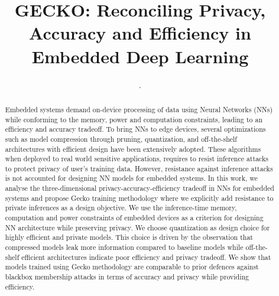 \documentclass[sigconf]{acmart}
\begin{document}
\title{GECKO: Reconciling Privacy, Accuracy and Efficiency in Embedded Deep Learning}

\author{.}


\begin{abstract}

Embedded systems demand on-device processing of data using Neural Networks (NNs) while conforming to the memory, power and computation constraints, leading to an efficiency and accuracy tradeoff. To bring NNs to edge devices, several optimizations such as model compression through pruning, quantization, and off-the-shelf architectures with efficient design have been extensively adopted. These algorithms when deployed to real world sensitive applications, requires to resist inference attacks to protect privacy of user’s training data. However, resistance against inference attacks is not accounted for designing NN models for embedded systems. In this work, we analyse the three-dimensional privacy-accuracy-efficiency tradeoff in NNs for embedded systems and propose Gecko training methodology where we explicitly add resistance to private inferences as a design objective. We use the inference-time memory, computation and power constraints of embedded devices as a criterion for designing NN architecture while preserving privacy. We choose quantization as design choice for highly efficient and private models. This choice is driven by the observation that compressed models leak more information compared to baseline models while off-the-shelf efficient architectures indicate poor efficiency and privacy tradeoff. We show that models trained using Gecko methodology are comparable to prior defences against blackbox membership attacks in terms of accuracy and privacy while providing efficiency.



\end{abstract}
\end{document}
